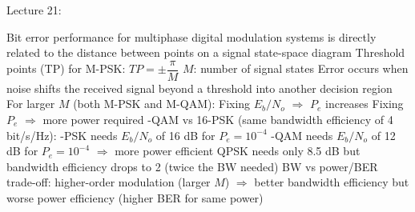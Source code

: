 \documentclass[openany]{book}
\begin{document}
Lecture 21:

\begin{outline}
	\1 Bit error performance for multiphase digital modulation systems is directly related to the distance between points on a signal state-space diagram
	\1 Threshold points (TP) for M-PSK:
	\2 $TP = \pm \dfrac{\pi}{M}$
	\2 $M$: number of signal states
	\2 Error occurs when noise shifts the received signal beyond a threshold into another decision region
	\1 For larger $M$ (both M-PSK and M-QAM):
	\2 Fixing $E_b/N_o$ $\Rightarrow$ $P_e$ increases
	\2 Fixing $P_e$ $\Rightarrow$ more power required
	-QAM vs 16-PSK (same bandwidth efficiency of 4 bit/s/Hz):
	-PSK needs $E_b/N_o$ of 16 dB for $P_e = 10^{-4}$
	-QAM needs $E_b/N_o$ of 12 dB for $P_e = 10^{-4}$ $\Rightarrow$ more power efficient
	\2 QPSK needs only 8.5 dB but bandwidth efficiency drops to 2 (twice the BW needed)
	\1 BW vs power/BER trade-off: higher-order modulation (larger $M$) $\Rightarrow$ better bandwidth efficiency but worse power efficiency (higher BER for same power)
\end{outline}
\end{document}
